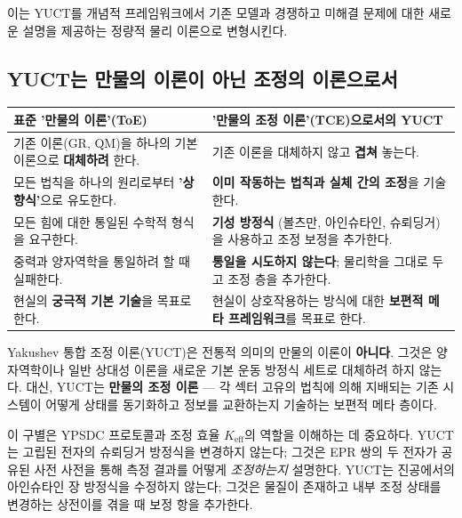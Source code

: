 \documentclass[11pt,a4paper]{article}
\begin{document}
	이는 YUCT를 개념적 프레임워크에서 기존 모델과 경쟁하고 미해결 문제에 대한 새로운 설명을 제공하는 정량적 물리 이론으로 변형시킨다.
	
	\subsection{YUCT는 만물의 이론이 아닌 조정의 이론으로서}
	\label{subsec:not-toe}
	
	\begin{tcolorbox}[title=YUCT vs 표준 만물의 이론 (ToE), 
		colback=blue!5!white, colframe=blue!50!black, 
		fonttitle=\bfseries, sharp corners]
		\small
		\begin{table}[H]
			\centering
			\begin{tabular}{p{0.45\textwidth} p{}}
				\toprule
				\textbf{표준 '만물의 이론'(ToE)} & \textbf{'만물의 조정 이론'(TCE)으로서의 YUCT} \\
				\midrule
				기존 이론(GR, QM)을 하나의 기본 이론으로 \textbf{대체하려} 한다. & 기존 이론을 대체하지 않고 \textbf{겹쳐} 놓는다. \\
				\addlinespace
				모든 법칙을 하나의 원리로부터 \textbf{'상향식'}으로 유도한다. & \textbf{이미 작동하는 법칙과 실체 간의 조정}을 기술한다. \\
				\addlinespace
				모든 힘에 대한 통일된 수학적 형식을 요구한다. & \textbf{기성 방정식} (볼츠만, 아인슈타인, 슈뢰딩거)을 사용하고 조정 보정을 추가한다. \\
				\addlinespace
				중력과 양자역학을 통일하려 할 때 실패한다. & \textbf{통일을 시도하지 않는다}; 물리학을 그대로 두고 조정 층을 추가한다. \\
				\addlinespace
				현실의 \textbf{궁극적 기본 기술}을 목표로 한다. & 현실이 상호작용하는 방식에 대한 \textbf{보편적 메타 프레임워크}를 목표로 한다. \\
				\bottomrule
			\end{tabular}
		\end{table}
	\end{tcolorbox}
	
	\vspace{0.5cm}
	\noindent
	Yakushev 통합 조정 이론(YUCT)은 전통적 의미의 만물의 이론이 \textbf{아니다}. 그것은 양자역학이나 일반 상대성 이론을 새로운 기본 운동 방정식 세트로 대체하려 하지 않는다. 대신, YUCT는 \textbf{만물의 조정 이론} — 각 섹터 고유의 법칙에 의해 지배되는 기존 시스템이 어떻게 상태를 동기화하고 정보를 교환하는지 기술하는 보편적 메타 층이다.
	
	이 구별은 YPSDC 프로토콜과 조정 효율 $K_{\mathrm{eff}}$의 역할을 이해하는 데 중요하다. YUCT는 고립된 전자의 슈뢰딩거 방정식을 변경하지 않는다; 그것은 EPR 쌍의 두 전자가 공유된 사전 사전을 통해 측정 결과를 어떻게 \emph{조정하는지} 설명한다. YUCT는 진공에서의 아인슈타인 장 방정식을 수정하지 않는다; 그것은 물질이 존재하고 내부 조정 상태를 변경하는 상전이를 겪을 때 보정 항을 추가한다.
	
\end{document}
